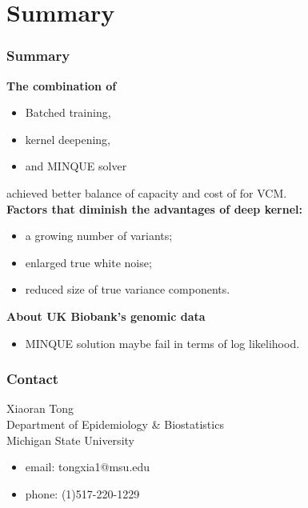 \documentclass{beamer}
\begin{document}
\section{Summary}
\begin{frame} %
  \frametitle{Summary} %
  \textbf{The combination of}
  \begin{itemize}
  \item Batched training,
  \item kernel deepening,
  \item and MINQUE solver
  \end{itemize}
  achieved better balance of capacity and cost of for VCM. \\
  \textbf{Factors that diminish the advantages of deep kernel:}
  \begin{itemize}
  \item a growing number of variants;
  \item enlarged true white noise;
  \item reduced size of true variance components.
  \end{itemize}
  \textbf{About UK Biobank's genomic data}
  \begin{itemize}
  \item MINQUE solution maybe fail in terms of log likelihood.
  \end{itemize}
\end{frame}
\begin{frame} %
  \frametitle{Contact} %
  Xiaoran Tong \\
  Department of Epidemiology \& Biostatistics \\
  Michigan State University
  \begin{itemize}
  \item email: tongxia1@msu.edu
  \item phone: (1)517-220-1229
  \end{itemize}
\end{frame}
\end{document}
